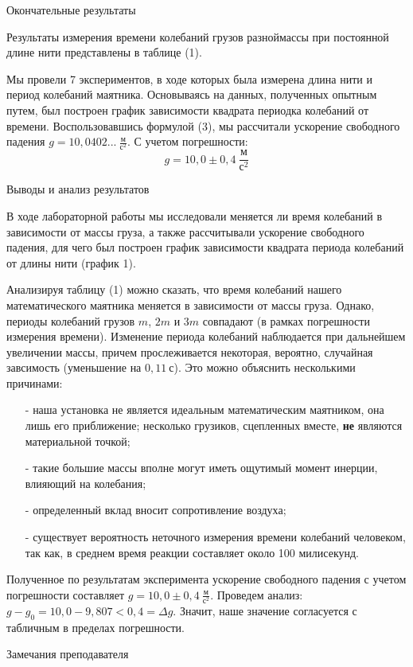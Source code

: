 \documentclass[12pt]{article}
\begin{document}
    \begin{point}{Окончательные результаты}
        \par Результаты измерения времени колебаний грузов разноймассы при постоянной длине нити представлены в таблице (1). 
        \par Мы провели 7 экспериментов, в ходе которых была измерена длина нити и период колебаний маятника. Основываясь на 
        данных, полученных опытным путем, был построен график зависимости квадрата периодка колебаний от времени. Воспользовавшись 
        формулой (3), мы рассчитали ускорение свободного падения $ g = 10,0402... \ \frac{\text{м}}{\text{с}^2} $. С учетом погрешности: 
        \[ g=10,0 \pm 0,4 \ \frac{\text{м}}{\text{с}^2} \]
    \end{point}
    
    \begin{point}{Выводы и анализ результатов}
        \par В ходе лабораторной работы мы исследовали меняется ли время колебаний в зависимости от массы груза, а также рассчитывали 
        ускорение свободного падения, для чего был построен график зависимости квадрата периода колебаний от длины нити (график 1).  
        \par Анализируя таблицу (1) можно сказать, что время колебаний нашего математического маятника меняется в зависимости от массы 
        груза. Однако, периоды колебаний грузов $m$, $2m$ и $3m$ совпадают (в рамках погрешности измерения времени). Изменение периода 
        колебаний наблюдается при дальнейшем увеличении массы, причем прослеживается некоторая, вероятно, случайная завсимость 
        (уменьшение на $0,11 \ \text{с}$). Это можно объяснить несколькими причинами:
        \begin{itemize}
            \item[-] наша установка не является идеальным математическим маятником, она лишь его приближение; несколько грузиков, сцепленных вместе, \textbf{не} являются материальной точкой;
            \item[-] такие большие массы вполне могут иметь ощутимый момент инерции, влияющий на колебания;
            \item[-] определенный вклад вносит сопротивление воздуха;
            \item[-] существует вероятность неточного измерения времени колебаний человеком, так как, в среднем время реакции составляет около 100 милисекунд.
        \end{itemize}
        \par Полученное по результатам эксперимента ускорение свободного падения с учетом погрешности составляет 
        $ g = 10,0 \pm 0,4 \ \frac{\text{м}}{\text{с}^2} $. Проведем анализ: $ g - g_0 = 10,0 - 9,807 < 0,4 = \Delta g$. 
        Значит, наше значение согласуется с табличным в пределах погрешности.
    \end{point}

    \begin{point}{Замечания преподавателя}
        \par
    \end{point}
    
\end{document}
